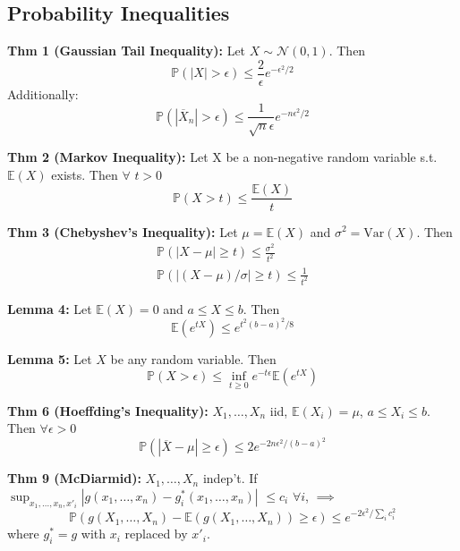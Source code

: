\documentclass[10pt,twocolumn]{article}
\begin{document}
\subsection*{Probability Inequalities}
\textbf{Thm 1 (Gaussian Tail Inequality):}
Let $X \sim \mathcal{N}(0,1)$. Then
\begin{equation}
    \mathbb{P}(|X| > \epsilon) \leq \frac{2}{\epsilon}e^{-\epsilon^{2}/2}
\end{equation}
Additionally:
\begin{equation}
\mathbb{P}(|\overline{X}_{n}| > \epsilon) \leq \frac{1}{\sqrt{n}\epsilon}e^{-n\epsilon^{2}/2}
\end{equation}
    
\textbf{Thm 2 (Markov Inequality):}
Let X be a non-negative random variable s.t. $\mathbb{E}(X)$ exists. Then $\forall$ $t>0$
\begin{equation}
    \mathbb{P}(X>t) \leq \frac{\mathbb{E}(X)}{t}
\end{equation}

\textbf{Thm 3 (Chebyshev's Inequality):}
Let $\mu = \mathbb{E}(X)$ and $\sigma^{2} = \text{Var}(X)$. Then
\begin{gather}
    \mathbb{P}(|X-\mu| \geq t) \leq \frac{\sigma^{2}}{t^{2}} \\
    \mathbb{P}(|(X-\mu)/\sigma| \geq t) \leq \frac{1}{t^{2}}
\end{gather}

\textbf{Lemma 4:}
Let $\mathbb{E}(X) = 0$ and $a \leq X \leq b$. Then
\begin{equation}
    \mathbb{E}(e^{tX}) \leq e^{t^{2}(b-a)^{2}/8}
\end{equation}

\textbf{Lemma 5:}
Let $X$ be any random variable. Then
\begin{equation}
    \mathbb{P}(X>\epsilon) \leq \inf_{t \geq 0} e^{-t\epsilon} \mathbb{E}(e^{tX})
\end{equation}

\textbf{Thm 6 (Hoeffding's Inequality):}
$X_{1},\ldots,X_{n}$ iid, $\mathbb{E}(X_{i}) = \mu$, $a \leq X_{i} \leq b$. Then $\forall \epsilon >0$
\begin{equation}
    \mathbb{P}(|\overline{X} - \mu| \geq \epsilon) \leq 2e^{-2n\epsilon^{2}/(b-a)^{2}}
\end{equation}

\textbf{Thm 9 (McDiarmid):} $X_{1},\ldots,X_{n}$ indep't. If\\
$\sup_{x_{1},\ldots,x_{n},x'_{i}} \left| g(x_{1},\ldots,x_{n}) - g_{i}^{*}(x_{1},\ldots,x_{n}) \right|$ $\leq c_{i}$ $\forall i$, $\implies$
\begin{equation}
    \mathbb{P} \left(g(X_{1},\ldots,X_{n})-\mathbb{E}(g(X_{1},\ldots,X_{n})) \geq \epsilon \right) \leq e^{-2\epsilon^{2}/\sum_{i}c_{i}^{2}}
\end{equation}
where $g_{i}^{*} = g$ with $x_{i}$ replaced by $x'_{i}$.
\end{document}
